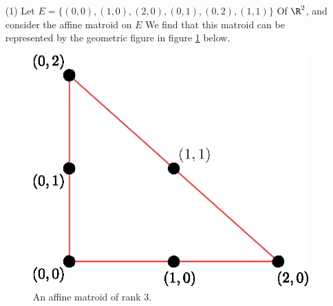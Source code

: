 \begin{example}\label{1.17}
    \begin{enumerate}
        \item[(1)] Let $E=\{(0,0), (1,0), (2,0), (0,1), (0,2), (1,1)\}$ Of $\R^2$,
            and consider the affine matroid on $E$ We find that this matroid can
            be represented by the geometric figure in figure \ref{fig_1.9} below.
            \begin{figure}[h]
                \centering
                \includegraphics[scale=0.8]{Figures/chapter1/rank_3_affine_matroid.eps}
                \caption{An affine matroid of rank $3$.}
                \label{fig_1.9}
            \end{figure}


\end{enumerate}
\end{example}

